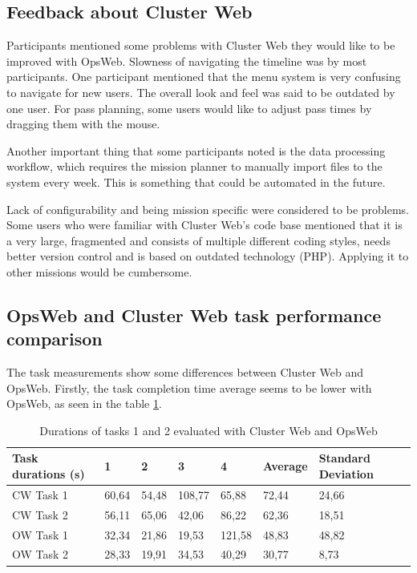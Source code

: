 \subsection{Feedback about Cluster Web}
Participants mentioned some problems with Cluster Web they would like to be improved with OpsWeb. Slowness of navigating the timeline was by most participants. One participant mentioned that the menu system is very confusing to navigate for new users. The overall look and feel was said to be outdated by one user. For pass planning, some users would like to adjust pass times by dragging them with the mouse.

Another important thing that some participants noted is the data processing workflow, which requires the mission planner to manually import files to the system every week. This is something that could be automated in the future. 

Lack of configurability and being mission specific were considered to be problems. Some users who were familiar with Cluster Web's code base mentioned that it is a very large, fragmented and consists of multiple different coding styles, needs better version control and is based on outdated technology (PHP). Applying it to other missions would be cumbersome.

\subsection{OpsWeb and Cluster Web task performance comparison} \label{cw_ow_task_perf}
The task measurements show some differences between Cluster Web and OpsWeb. Firstly, the task completion time average seems to be lower with OpsWeb, as seen in the table \ref{cw_ow_times}.

\begin{table}[!ht]
\def\arraystretch{1.1}%
    \begin{center}
    \caption{Durations of tasks 1 and 2 evaluated with Cluster Web and OpsWeb}
    \label{cw_ow_times}
    \begin{tabular}{| l | l | l | l | l | l | l | }
    \hline
    Task durations (s) & 1     & 2     & 3      & 4      & Average & Standard Deviation \\
    \hline
    CW Task 1            & 60,64 & 54,48 & 108,77 & 65,88  & 72,44   & 24,66              \\
    CW Task 2            & 56,11 & 65,06 & 42,06  & 86,22  & 62,36   & 18,51              \\
    OW Task 1            & 32,34 & 21,86 & 19,53  & 121,58 & 48,83   & 48,82              \\
    OW Task 2            & 28,33 & 19,91 & 34,53  & 40,29  & 30,77   & 8,73              \\
    \hline
    \end{tabular}
    \end{center}
\end{table}

